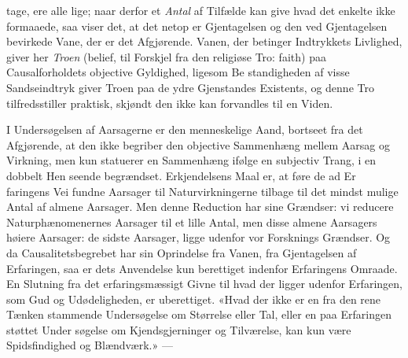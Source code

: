 \documentclass[12pt,a4paper]{book}
\begin{document}
tage, ere alle lige; naar derfor et \emph{Antal} af Tilfælde kan give
hvad det enkelte ikke formaaede, saa viser det, at det netop
er Gjentagelsen og den ved Gjentagelsen bevirkede Vane, der
er det Afgjørende. Vanen, der betinger Indtrykkets Livlighed,
giver her \emph{Troen} (belief, til Forskjel fra den religiøse Tro:
faith) paa Causalforholdets objective Gyldighed, ligesom Be\-%
standigheden af visse Sandseindtryk giver Troen paa de ydre
Gjenstandes Existents, og denne Tro tilfredsstiller praktisk,
skjøndt den ikke kan forvandles til en Viden.

I Undersøgelsen af Aarsagerne er den menneskelige Aand,
bortseet fra det Afgjørende, at den ikke begriber den objective
Sammenhæng mellem Aarsag og Virkning, men kun statuerer
en Sammenhæng ifølge en subjectiv Trang, i en dobbelt Hen\-%
seende begrændset. Erkjendelsens Maal er, at føre de ad Er\-%
faringens Vei fundne Aarsager til Naturvirkningerne tilbage til
det mindst mulige Antal af almene Aarsager. Men denne
Reduction har sine Grændser: vi reducere Naturphænomenernes
Aarsager til et lille Antal, men disse almene Aarsagers høiere
Aarsager: de sidste Aarsager, ligge udenfor vor Forsknings
Grændser. Og da Causalitetsbegrebet har sin Oprindelse fra
Vanen, fra Gjentagelsen af Erfaringen, saa er dets Anvendelse
kun berettiget indenfor Erfaringens Omraade. En Slutning
fra det erfaringsmæssigt Givne til hvad der ligger udenfor
Erfaringen, som Gud og Udødeligheden, er uberettiget. «Hvad
der ikke er en fra den rene Tænken stammende Undersøgelse
om Størrelse eller Tal, eller en paa Erfaringen støttet Under\-%
søgelse om Kjendsgjerninger og Tilværelse, kan kun være
Spidsfindighed og Blændværk.» ---
\end{document}
